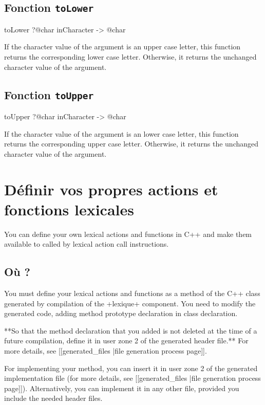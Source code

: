 \subsection{Fonction \texttt{toLower}}

\begin{galgas}
toLower ?@char inCharacter -> @char
\end{galgas}

If the character value of the argument is an upper case letter, this function returns the corresponding lower case letter. Otherwise, it returns the unchanged character value of the argument.

\subsection{Fonction \texttt{toUpper}}

\begin{galgas}
toUpper ?@char inCharacter -> @char
\end{galgas}


If the character value of the argument is an lower case letter, this function returns the corresponding upper case letter. Otherwise, it returns the unchanged character value of the argument.



\section{Définir vos propres actions et fonctions lexicales}

You can define your own lexical actions and functions in C++ and make them available to called by lexical action call instructions.

\subsection{Où ?}

You must define your lexical actions and functions as a method of the C++ class generated by compilation of the \ggs+lexique+ component. You need to modify the generated code, adding method prototype declaration in class declaration.

**So that the method declaration that you added is not deleted at the time of a future compilation, define it in user zone 2 of the generated header file.** For more details, see [[generated\_files |file generation process page]].

For implementing your method, you can insert it in user zone 2 of the generated implementation file (for more details, see [[generated\_files |file generation process page]]). Alternatively, you can implement it in any other file, provided you include the needed header files.

